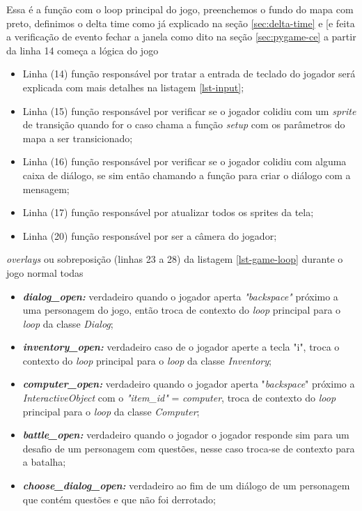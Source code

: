 
\newpage
Essa é a função com o loop principal do jogo, preenchemos o fundo do mapa com preto, definimos o delta time como já explicado na seção \ref{sec:delta-time} e [e feita a verificação de evento fechar a janela como dito na seção \ref{sec:pygame-ce} a partir da linha 14 começa a lógica do jogo
\begin{itemize}
    \item Linha (14) função responsável por tratar a entrada de teclado do jogador será explicada com mais detalhes na listagem \ref{lst-input};
    \item Linha (15) função responsável por verificar se o jogador colidiu com um \textit{sprite} de transição quando for o caso chama a função \textit{setup} com os parâmetros do mapa a ser transicionado;
    \item Linha (16) função responsável por verificar se o jogador colidiu com alguma caixa de diálogo, se sim então chamando a função para criar o diálogo com a mensagem; 
    \item Linha (17) função responsável por atualizar todos os sprites da tela; 
    \item Linha (20) função responsável por ser a câmera do jogador; 
\end{itemize}

\textit{overlays} ou sobreposição 
(linhas 23 a 28) da listagem \ref{lst-game-loop} durante o jogo normal todas 
\begin{itemize}
    \item \textit{\textbf{dialog\_open: }} verdadeiro quando o jogador aperta \textit{"backspace"} próximo a uma personagem do jogo, então troca de contexto do \textit{loop} principal para o \textit{loop} da classe \textit{Dialog};
    \item \textit{\textbf{inventory\_open: }}verdadeiro caso de o jogador aperte a tecla "i", troca o contexto do \textit{loop} principal para o \textit{loop} da classe \textit{Inventory}; 
    \item \textit{\textbf{computer\_open: }} verdadeiro quando o jogador aperta "\textit{backspace}" próximo a \textit{InteractiveObject} com o \textit{"item\_id"} = \textit{computer}, troca de contexto do \textit{loop} principal para o \textit{loop} da classe \textit{Computer};
    \item \textit{\textbf{battle\_open: }}  verdadeiro quando o jogador o jogador responde sim para um desafio de um personagem com questões, nesse caso troca-se de contexto para a batalha;
    \item \textit{\textbf{choose\_dialog\_open: }} verdadeiro ao fim de um diálogo de um personagem que contém questões e que não foi derrotado;

\end{itemize}



